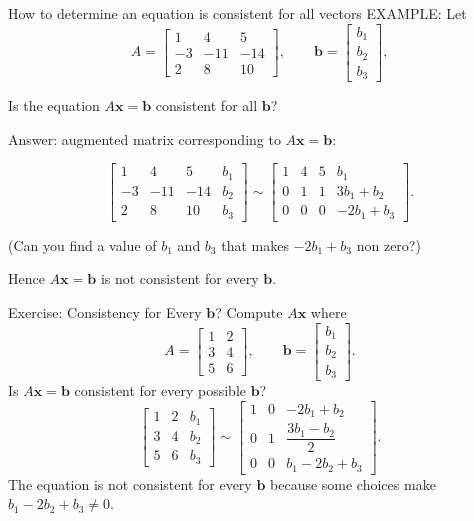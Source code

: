 \begin{frame}{How to determine an equation is consistent for all vectors}
  EXAMPLE: Let
  \[
    A=\begin{bmatrix}1&4&5\\-3&-11&-14\\2&8&10\end{bmatrix},\qquad
    \mathbf{b}=\begin{bmatrix}b_1\\b_2\\b_3\end{bmatrix},
  \]

  Is the equation $A\mathbf{x}=\mathbf{b}$ consistent for all $\mathbf{b}$?

  Answer: augmented matrix corresponding to $A\mathbf{x}=\mathbf{b}$:
  
  \[
    \left[\begin{array}{cccc}1&4&5&b_1\\-3&-11&-14&b_2\\2&8&10&b_3\end{array}\right]
    \sim
    \left[\begin{array}{cccc}
      1&4&5&b_1\\
      0&1&1&3b_1+b_2\\
      0&0&0&-2b_1+b_3
    \end{array}\right].
  \]

  (Can you find a value of $b_1$ and $b_3$ that makes $-2b_1+b_3$ non zero?)

  Hence $A\mathbf{x}=\mathbf{b}$ is \alert{not} consistent for every $\mathbf{b}$.
\end{frame}
\begin{frame}{Exercise: Consistency for Every $\mathbf{b}$?}
  Compute $A\mathbf{x}$ where 
  \[
    A=\begin{bmatrix}1&2\\3&4\\5&6\end{bmatrix},\qquad
    \mathbf{b}=\begin{bmatrix}b_1\\b_2\\b_3\end{bmatrix}.
  \]
  Is $A\mathbf{x}=\mathbf{b}$ consistent for every possible $\mathbf{b}$?
  \[
    \left[\begin{array}{cc|c}1&2&b_1\\3&4&b_2\\5&6&b_3\end{array}\right]
    \sim
    \left[\begin{array}{cc|c}
      1&0&-2b_1+b_2\\
      0&1&\dfrac{3b_1-b_2}{2}\\
      0&0&b_1-2b_2+b_3
    \end{array}\right].
  \]
  The equation is not consistent for every $\mathbf{b}$ because some choices
  make $b_1-2b_2+b_3\ne0$.
\end{frame}


